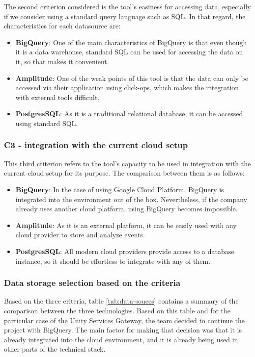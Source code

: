 \documentclass[english, 12pt, a4paper, sci, utf8, a-1b, online]{aaltothesis}
\begin{document}
The second criterion considered is the tool's easiness for accessing data, especially if we consider using a standard query language such as SQL. In that regard, the characteristics for each datasource are:
\begin{itemize}
    \item \textbf{BigQuery}: One of the main characteristics of BigQuery is that even though it is a data warehouse, standard SQL can be used for accessing the data on it, so that makes it convenient.
    \item \textbf{Amplitude}: One of the weak points of this tool is that the data can only be accessed via their application using click-ops, which makes the integration with external tools difficult.
    \item \textbf{PostgresSQL}: As it is a traditional relational database, it can be accessed using standard SQL.
\end{itemize}

\subsubsection*{C3 - integration with the current cloud setup}

This third criterion refers to the tool's capacity to be used in integration with the current cloud setup for its purpose. The comparison between them is as follows:

\begin{itemize}
    \item \textbf{BigQuery}: In the case of using Google Cloud Platform, BigQuery is integrated into the environment out of the box. Nevertheless, if the company already uses another cloud platform, using BigQuery becomes impossible.
    \item \textbf{Amplitude}: As it is an external platform, it can be easily used with any cloud provider to store and analyze events. 
    \item \textbf{PostgresSQL}: All modern cloud providers provide access to a database instance, so it should be effortless to integrate with any of them. 
\end{itemize}

\subsubsection*{Data storage selection based on the criteria}

Based on the three criteria, table \ref{tab:data-souces} contains a summary of the comparison between the three technologies. Based on this table and for the particular case of the Unity Services Gateway, the team decided to continue the project with BigQuery. The main factor for making that decision was that it is already integrated into the cloud environment, and it is already being used in other parts of the technical stack.\\
\end{document}
